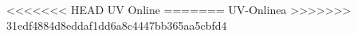 \documentclass{article}
\begin{document}
<<<<<<< HEAD
UV Online 
=======
UV-Onlinea
>>>>>>> 31edf4884d8eddaf1dd6a8c4447bb365aa5cbfd4
\end{document}
